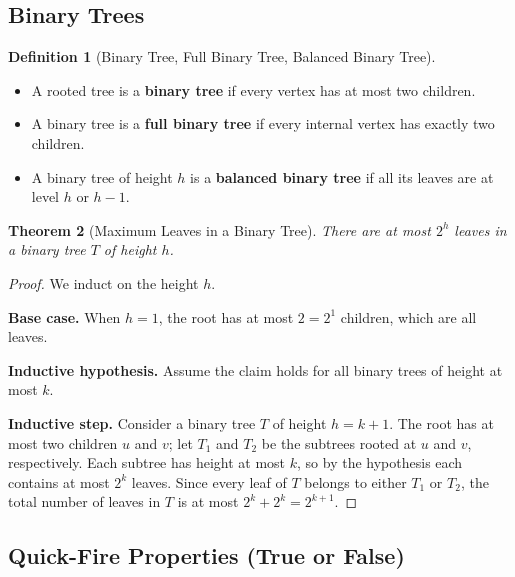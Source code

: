 \documentclass[11pt, a4paper, notitlepage]{report}
\newtheorem{theorem}{Theorem}[section]
\theoremstyle{definition}
\newtheorem{definition}[theorem]{Definition}
\theoremstyle{remark}
\begin{document}
\subsection{Binary Trees}
\label{subsec:binary-trees}

\begin{definition}[Binary Tree, Full Binary Tree, Balanced Binary Tree]
\label{def:binary-tree}
\leavevmode
\begin{itemize}
  \item A rooted tree is a \textbf{binary tree} if every vertex has at most two children.
  \item A binary tree is a \textbf{full binary tree} if every internal vertex has exactly two children.
  \item A binary tree of height $h$ is a \textbf{balanced binary tree} if all its leaves are at level $h$ or $h - 1$.
\end{itemize}
\end{definition}

\begin{theorem}[Maximum Leaves in a Binary Tree]
\label{thm:binary-tree-leaves}
There are at most $2^h$ leaves in a binary tree $T$ of height $h$.
\end{theorem}

\begin{proof}
We induct on the height $h$.

\textbf{Base case.} When $h = 1$, the root has at most $2 = 2^1$ children, which are all leaves.

\textbf{Inductive hypothesis.} Assume the claim holds for all binary trees of height at most $k$.

\textbf{Inductive step.} Consider a binary tree $T$ of height $h = k + 1$. The root has at most two children $u$ and $v$; let $T_1$ and $T_2$ be the subtrees rooted at $u$ and $v$, respectively. Each subtree has height at most $k$, so by the hypothesis each contains at most $2^k$ leaves. Since every leaf of $T$ belongs to either $T_1$ or $T_2$, the total number of leaves in $T$ is at most $2^k + 2^k = 2^{k+1}$.
\end{proof}

\subsection{Quick-Fire Properties (True or False)}
\label{subsec:tree-tf}
\end{document}
